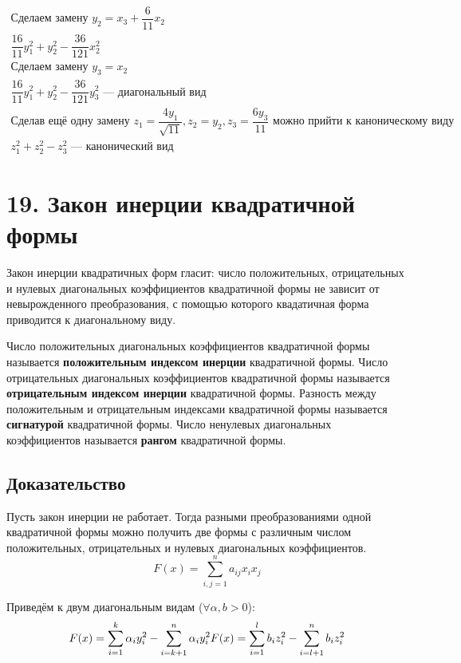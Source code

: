 \documentclass[12pt]{article}
\begin{document}
\[\begin{array}{l}
        \text{Сделаем замену } y_2 = x_3 + \dfrac{6}{11}x_2                                                                                             \\
        \dfrac{16}{11}y_1^2 + y_2^2 - \dfrac{36}{121}x_2^2                                                                                              \\
        \text{Сделаем замену } y_3 = x_2                                                                                                                \\
        \dfrac{16}{11}y_1^2 + y_2^2 - \dfrac{36}{121}y_3^2 \text{ — диагональный вид}                                                                   \\
        \text{Сделав ещё одну замену } z_1 = \dfrac{4y_1}{\sqrt{11}}, z_2 = y_2, z_3 = \dfrac{6y_3}{11} \text{ можно прийти к каноническому виду}       \\
        z_1^2 + z_2^2 - z_3^2 \text{ — канонический вид}
    \end{array}
\]
\section{19. Закон инерции квадратичной формы}
Закон инерции квадратичных форм гласит: число положительных, отрицательных и нулевых диагональных коэффициентов квадратичной формы не зависит от невырожденного преобразования, с помощью которого квадатичная форма приводится к диагональному виду.

Число положительных диагональных коэффициентов квадратичной формы называется \textbf{положительным индексом инерции} квадратичной формы. Число отрицательных диагональных коэффициентов квадратичной формы называется \textbf{отрицательным индексом инерции} квадратичной формы. Разность между положительным и отрицательным индексами квадратичной формы называется \textbf{сигнатурой} квадратичной формы. Число ненулевых диагональных коэффициентов называется \textbf{рангом} квадратичной формы.

\subsection{Доказательство}
Пусть закон инерции не работает. Тогда разными преобразованиями одной квадратичной формы можно получить две формы с различным числом положительных, отрицательных и нулевых диагональных коэффициентов.
\[
    F(x) = \sum^n_{i,j=1}a_{ij}x_ix_j
\]

Приведём к двум диагональным видам ($\forall \alpha, b > 0$):
\[
    F(x) = \sum^k_{i=1}\alpha_{i}y_i^2 - \sum^n_{i=k + 1}\alpha_{i}y_i^2
    \\
    F(x) = \sum_{i=1}^lb_iz_i^2 - \sum_{i = l + 1}^nb_iz_i^2
\]
\end{document}
